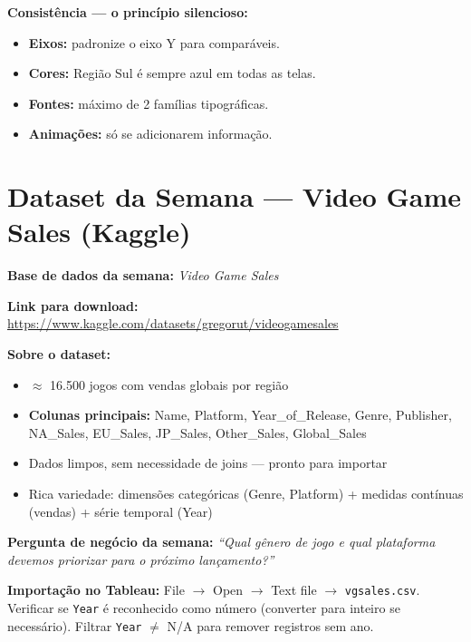 \begin{SolvedBox}
\textbf{Consistência — o princípio silencioso:}

\begin{itemize}
  \item \textbf{Eixos:} padronize o eixo Y para comparáveis.
  \item \textbf{Cores:} Região Sul é sempre azul em todas as telas.
  \item \textbf{Fontes:} máximo de 2 famílias tipográficas.
  \item \textbf{Animações:} só se adicionarem informação.
\end{itemize}
\end{SolvedBox}

\section{Dataset da Semana — Video Game Sales (Kaggle)}

\begin{BoardBox}
\textbf{Base de dados da semana:} \textit{Video Game Sales}

\textbf{Link para download:}
\url{https://www.kaggle.com/datasets/gregorut/videogamesales}

\textbf{Sobre o dataset:}
\begin{itemize}
  \item $\approx$ 16.500 jogos com vendas globais por região
  \item \textbf{Colunas principais:} Name, Platform, Year\_of\_Release,
  Genre, Publisher, NA\_Sales, EU\_Sales, JP\_Sales, Other\_Sales,
  Global\_Sales
  \item Dados limpos, sem necessidade de joins — pronto para importar
  \item Rica variedade: dimensões categóricas (Genre, Platform) +
  medidas contínuas (vendas) + série temporal (Year)
\end{itemize}

\textbf{Pergunta de negócio da semana:}
\textit{``Qual gênero de jogo e qual plataforma devemos priorizar
para o próximo lançamento?''}
\end{BoardBox}

\begin{NoteBox}
\textbf{Importação no Tableau:} File $\to$ Open $\to$ Text file $\to$
\texttt{vgsales.csv}. Verificar se \texttt{Year} é reconhecido como
número (converter para inteiro se necessário).
Filtrar \texttt{Year} $\neq$ N/A para remover registros sem ano.
\end{NoteBox}

